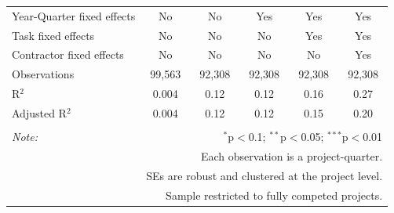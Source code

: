 \documentclass[
]{article}
\begin{document}
\begin{table}[H]
\begin{tabular}{@{\extracolsep{-2pt}}lccccc}
Year-Quarter fixed effects & No & No & Yes & Yes & Yes \\ 
Task fixed effects & No & No & No & Yes & Yes \\ 
Contractor fixed effects & No & No & No & No & Yes \\ 
Observations & 99,563 & 92,308 & 92,308 & 92,308 & 92,308 \\ 
R$^{2}$ & 0.004 & 0.12 & 0.12 & 0.16 & 0.27 \\ 
Adjusted R$^{2}$ & 0.004 & 0.12 & 0.12 & 0.15 & 0.20 \\ 
\hline 
\hline \\[-1.8ex] 
\textit{Note:}  & \multicolumn{5}{r}{$^{*}$p$<$0.1; $^{**}$p$<$0.05; $^{***}$p$<$0.01} \\ 
 & \multicolumn{5}{r}{Each observation is a project-quarter.} \\ 
 & \multicolumn{5}{r}{SEs are robust and clustered at the project level.} \\ 
 & \multicolumn{5}{r}{Sample restricted to fully competed projects.} \\ 
\end{tabular} 
\end{table}
\end{document}
